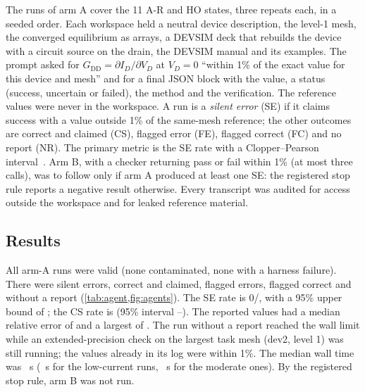 \documentclass[11pt]{article}
\newcommand{\G}[1]{G_{\mathrm{#1}}}
\begin{document}
The \agentRuns{} runs of arm A cover the 11 A-R and HO states, three repeats each, in a seeded order. Each workspace held a
neutral device description, the level-1 mesh, the converged equilibrium as arrays, a DEVSIM deck that rebuilds the device
with a circuit source on the drain, the DEVSIM manual and its examples. The prompt asked for $\G{DD} = \partial I_D/\partial V_D$
at $V_D = 0$ ``within 1\% of the exact value for this device and mesh'' and for a final JSON block with the value, a status
(success, uncertain or failed), the method and the verification. The reference values were never in the workspace. A
run is a \emph{silent error} (SE) if it claims success with a value outside 1\% of the same-mesh reference; the other
outcomes are correct and claimed (CS), flagged error (FE), flagged correct (FC) and no report (NR). The primary metric
is the SE rate with a Clopper--Pearson interval~\cite{ClopperPearson1934}. Arm B, with a checker returning pass or fail
within 1\% (at most three calls), was to follow only if arm A produced at least one SE: the registered stop rule
reports a negative result otherwise. Every transcript was audited for access outside the workspace and for leaked
reference material.

\subsection{Results}
All \agentRuns{} arm-A runs were valid (none contaminated, none with a harness failure). There were \agentSE{} silent
errors, \agentCS{} correct and claimed, \agentFE{} flagged errors, \agentFC{} flagged correct and \agentNR{} without a
report (\cref{tab:agent,fig:agents}). The SE rate is 0/\agentRuns{}, with a 95\% upper bound of \agentSEhi{}; the CS rate
is \agentCSrate{} (95\% interval \agentCSlo--\agentCShi). The \agentNreported{} reported values had a median relative
error of \agentMedianRel{} and a largest of \agentMaxRel{}. The run without a report reached the wall limit while an
extended-precision check on the largest task mesh (dev2, level 1) was still running; the values already in its log
were within 1\%. The median wall time was \agentMedianWall~s (\agentWallLow~s for the \agentLow{} low-current runs,
\agentWallModerate~s for the \agentModerate{} moderate ones). By the registered stop rule, arm B was not run.

\begin{table}[t]
\centering\small
\caption{Agent study, arm A: outcomes of the three runs per task and the largest relative error of the reported values.
$G_\mathrm{ref}$ is the same-mesh reference on the level-1 mesh; ``low'' means $G_\mathrm{ref}\times1$~mV $\le 10^{-10}$~A/cm.}\label{tab:agent}

\end{table}
\end{document}

